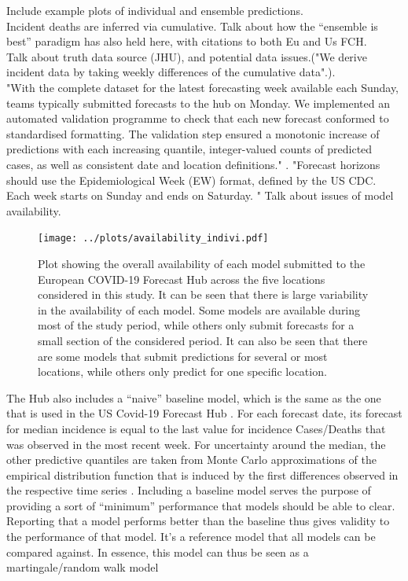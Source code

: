 Include example plots of individual and ensemble predictions.\\
Incident deaths are inferred via cumulative.
Talk about how the ``ensemble is best'' paradigm has also held here, with citations to both Eu and Us FCH.\\
Talk about truth data source (JHU), and potential data issues.("We derive incident data by taking weekly differences of the cumulative data".).\\
"With the complete dataset for the latest forecasting week available each Sunday, teams typically
submitted forecasts to the hub on Monday. We implemented an automated validation
programme to check that each new forecast conformed to standardised formatting. The
validation step ensured a monotonic increase of predictions with each increasing quantile,
integer-valued counts of predicted cases, as well as consistent date and location definitions." \citep{sherratt_draft_nodate}.
"Forecast horizons should use the Epidemiological Week (EW) format, defined by the US CDC. Each week starts on Sunday and ends on Saturday. "
Talk about issues of model availability.\\
\begin{figure}
\texttt{[image: ../plots/availability\_indivi.pdf]}
\caption{Plot showing the overall availability of each model submitted to the European COVID-19 Forecast Hub across the five locations considered in this study. It can be seen that there is large variability in the availability of each model. Some models are available during most of the study period, while others only submit forecasts for a small section of the considered period. It can also be seen that there are some models that submit predictions for several or most locations, while others only predict for one specific location.}
\end{figure}
The Hub also includes a ``naive'' baseline model, which is the same as the one that is used in the US Covid-19 Forecast Hub . For each forecast date, its forecast for median incidence is equal to the last value for incidence Cases/Deaths that was observed in the most recent week. For uncertainty around the median, the other predictive quantiles are taken from Monte Carlo approximations of the empirical distribution function that is induced by the first differences observed in the respective time series \citep{cramer_evaluation_2022}. Including a baseline model serves the purpose of providing a sort of ``minimum'' performance that models should be able to clear. Reporting that a model performs better than the baseline thus gives validity to the performance of that model. It's a reference model that all models can be compared against. In essence, this model can thus be seen as a martingale/random walk model\\
